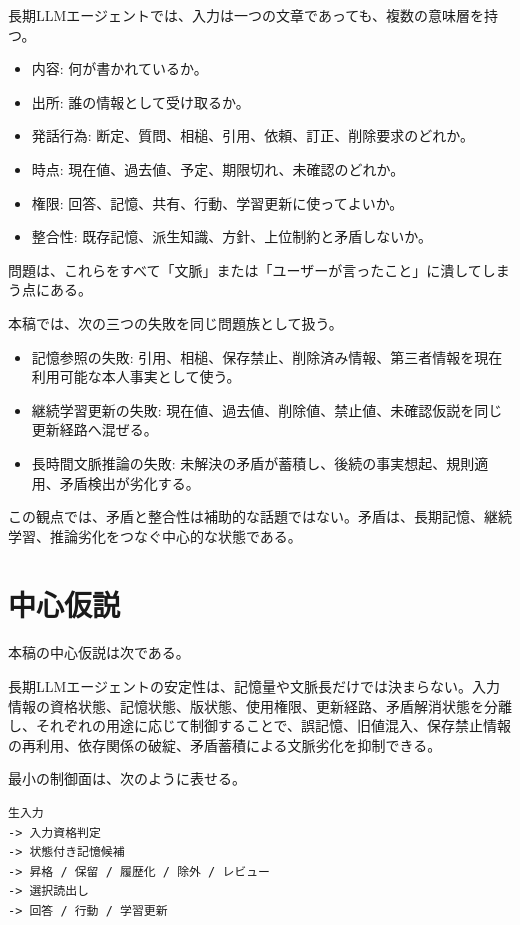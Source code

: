 \documentclass[12pt,a4paper]{article}
\begin{document}
長期LLMエージェントでは、入力は一つの文章であっても、複数の意味層を持つ。

\begin{itemize}
\tightlist
\item
  内容: 何が書かれているか。
\item
  出所: 誰の情報として受け取るか。
\item
  発話行為: 断定、質問、相槌、引用、依頼、訂正、削除要求のどれか。
\item
  時点: 現在値、過去値、予定、期限切れ、未確認のどれか。
\item
  権限: 回答、記憶、共有、行動、学習更新に使ってよいか。
\item
  整合性: 既存記憶、派生知識、方針、上位制約と矛盾しないか。
\end{itemize}

問題は、これらをすべて「文脈」または「ユーザーが言ったこと」に潰してしまう点にある。

本稿では、次の三つの失敗を同じ問題族として扱う。

\begin{itemize}
\tightlist
\item
  記憶参照の失敗: 引用、相槌、保存禁止、削除済み情報、第三者情報を現在利用可能な本人事実として使う。
\item
  継続学習更新の失敗: 現在値、過去値、削除値、禁止値、未確認仮説を同じ更新経路へ混ぜる。
\item
  長時間文脈推論の失敗: 未解決の矛盾が蓄積し、後続の事実想起、規則適用、矛盾検出が劣化する。
\end{itemize}

この観点では、矛盾と整合性は補助的な話題ではない。矛盾は、長期記憶、継続学習、推論劣化をつなぐ中心的な状態である。

\section{中心仮説}\label{ux4e2dux5fc3ux4eeeux8aac}

本稿の中心仮説は次である。

長期LLMエージェントの安定性は、記憶量や文脈長だけでは決まらない。入力情報の資格状態、記憶状態、版状態、使用権限、更新経路、矛盾解消状態を分離し、それぞれの用途に応じて制御することで、誤記憶、旧値混入、保存禁止情報の再利用、依存関係の破綻、矛盾蓄積による文脈劣化を抑制できる。

最小の制御面は、次のように表せる。

\begin{verbatim}
生入力
-> 入力資格判定
-> 状態付き記憶候補
-> 昇格 / 保留 / 履歴化 / 除外 / レビュー
-> 選択読出し
-> 回答 / 行動 / 学習更新
\end{verbatim}
\end{document}
